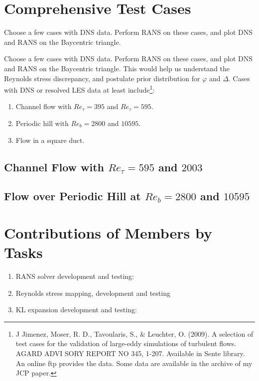 \documentclass[paper = letter, fontsize = 11pt]{scrartcl} %
\begin{document}
\section{Comprehensive Test Cases}

 {Choose a few cases with DNS
  data. Perform RANS on these cases, and plot DNS and RANS on the Baycentric triangle. }

Choose a few cases with DNS data. Perform RANS on these cases, and plot DNS and RANS on the
Baycentric triangle.  This would help us understand the Reynolds stress discrepancy, and postulate
prior distribution for $\varphi$ and $\Delta$. Cases with DNS or resolved LES data at least
include\footnote{J Jimenez, Moser, R. D., Tavoularis, S., \& Leuchter, O. (2009). A selection of
  test cases for the validation of large-eddy simulations of turbulent flows. AGARD ADVI SORY REPORT
  NO 345, 1-207. Available in Sente library. An online ftp provides the data. Some data are
  available in the archive of my JCP paper.}:
\begin{enumerate}
\item Channel flow with  $Re_\tau = 395$  and  $Re_\tau = 595$.
\item Periodic hill with $Re_b= 2800$ and $10595$.
\item Flow in a square duct.
\end{enumerate}


\subsection{Channel Flow with $Re_\tau = 595$ and $2003$}

\subsection{Flow over Periodic Hill at $Re_b= 2800$ and $10595$}

\appendix

\section{Contributions of Members by Tasks}

\begin{enumerate}
\item RANS solver development and testing:
\item Reynolds stress mapping, development and testing 
\item KL expansion development and testing:
\end{enumerate}



%


\end{document}
